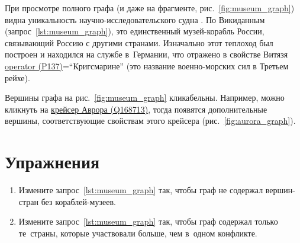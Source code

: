 При просмотре полного графа (и даже на фрагменте, рис.~\ref{fig:museum_graph}) 
видна уникальность научно-иссле\-до\-ва\-тель\-ского судна . 
По Викиданным (запрос~\ref{lst:museum_graph}), 
это единственный музей-корабль России, связывающий Россию с другими странами. 
Изначально этот теплоход был построен и находился на службе в~Германии, 
что отражено в свойстве Витязя 
\href{https://www.wikidata.org/wiki/Property:P137}{operator (P137)}=``Кригсма\-рине'' 
(это название военно-морских сил в Третьем рейхе).

Вершины графа на рис.~\ref{fig:museum_graph} кликабельны. 
Например, можно кликнуть на \href{https://www.wikidata.org/wiki/Q168713}{крейсер Аврора (Q168713)}, 
тогда появятся дополнительные вершины, соответствующие свойствам этого крейсера (рис.~\ref{fig:aurora_graph}).


\section{Упражнения}
\begin{enumerate}
  \item Измените запрос~\ref{lst:museum_graph} так, 
      чтобы граф не содержал вершин-стран без кораблей-музеев. 
  
  \item Измените запрос~\ref{lst:museum_graph} так, чтобы граф содержал 
      только те~страны, которые участвовали больше, чем в~одном конфликте.
\end{enumerate}


